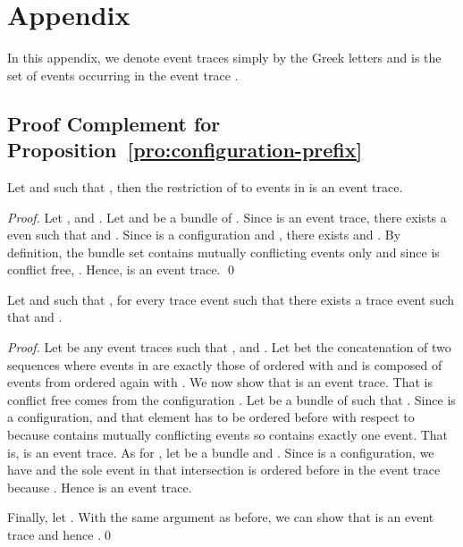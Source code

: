 \documentclass{llncs}
\newcommand{\<}{\langle}
\renewcommand{\>}{\rangle}
\begin{document}



\newpage
\clearpage{}\section*{Appendix}

\renewenvironment{theorem}[2][Theorem]{\begin{trivlist}
\item[\hskip \labelsep {\bfseries #1}\hskip \labelsep {\bfseries #2}]}{\end{trivlist}}
\newenvironment{repproposition}[2][Proposition]{\begin{trivlist}
\item[\hskip \labelsep {\bfseries #1}\hskip \labelsep {\bfseries #2}]}{\end{trivlist}}

In this appendix, we denote event traces simply by the Greek letters  and  is the set of events occurring in the event trace . 

\subsection{Proof Complement for Proposition~\ref{pro:configuration-prefix}}



\begin{lemma}\label{pro:trace-restriction}
Let  and  such that , then the restriction  of  to events in  is an event trace.
\end{lemma}

\begin{proof}
Let ,  and . Let  and  be a bundle of . Since  is an event trace, there exists a even  such that  and . Since  is a configuration and , there exists  and . By definition, the bundle set  contains mutually conflicting events only and since  is conflict free, . Hence,  is an event trace.  \qed
\end{proof}

\begin{lemma}\label{pro:trace-extension}
Let  and  such that , for every trace event  such that  there exists a trace event  such that  and .
\end{lemma}

\begin{proof}
Let  be any event traces such that ,  and . Let  bet the concatenation of two sequences  where events in  are exactly those of  ordered with  and  is composed of events from  ordered again with . We now show that  is an event trace. That  is conflict free comes from the configuration . Let  be a bundle of  such that . Since  is a configuration,  and that element has to be ordered before  with respect to  because  contains mutually conflicting events so  contains exactly one event. That is,  is an event trace. As for , let  be a bundle and . Since  is a configuration, we have  and the sole event in that intersection is ordered before  in the event trace  because . Hence  is an event trace. 

Finally, let . With the same argument as before, we can show that  is an event trace and hence .\qed
\end{proof}
\end{document}
